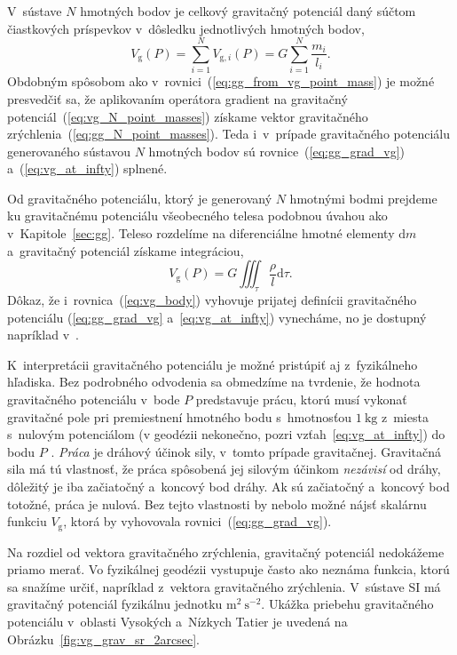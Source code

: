 \documentclass[a4paper, 12pt]{book}
\newcommand{\diff}{\mathrm d}
\newcommand{\gidx}{\mathrm g}
\begin{document}
V~sústave $N$ hmotných bodov je celkový gravitačný potenciál daný súčtom 
čiastkových príspevkov v~dôsledku jednotlivých hmotných bodov,
%
\begin{equation}
\label{eq:vg_N_point_masses}
V_\gidx(P) = \sum_{i = 1}^{N} V_{\gidx,i}(P) = G \sum_{i = 1}^{N}\frac{
m_i}{l_i}{.}
\end{equation}
%
Obdobným spôsobom ako v~rovnici~(\ref{eq:gg_from_vg_point_mass}) je možné 
presvedčiť sa, že aplikovaním operátora gradient na gravitačný 
potenciál~(\ref{eq:vg_N_point_masses}) získame vektor gravitačného 
zrýchlenia~(\ref{eq:gg_N_point_masses}).  Teda i~v~prípade gravitačného 
potenciálu generovaného sústavou $N$ hmotných bodov sú 
rovnice~(\ref{eq:gg_grad_vg}) a~(\ref{eq:vg_at_infty}) splnené.

Od gravitačného potenciálu, ktorý je generovaný $N$ hmotnými bodmi prejdeme ku 
gravitačnému potenciálu všeobecného telesa podobnou úvahou ako 
v~Kapitole~\ref{sec:gg}.  Teleso rozdelíme na diferenciálne hmotné elementy 
$\diff m$ a~gravitačný potenciál získame integráciou,
%
\begin{equation}
\label{eq:vg_body}
V_\gidx(P) = G \iiint_{\tau} \frac{\rho}{l} \diff\tau{.}
\end{equation}
%
Dôkaz, že i~rovnica~(\ref{eq:vg_body}) vyhovuje prijatej definícii gravitačného 
potenciálu (\ref{eq:gg_grad_vg} a~\ref{eq:vg_at_infty}) vynecháme, no je 
dostupný napríklad v~\cite{MacMillan1930}.

K~interpretácii gravitačného potenciálu je možné pristúpiť aj z~fyzikálneho 
hľadiska.  Bez podrobného odvodenia sa obmedzíme na tvrdenie, že hodnota 
gravitačného potenciálu v~bode $P$ predstavuje prácu, ktorú musí vykonať 
gravitačné pole pri premiestnení hmotného bodu s~hmotnosťou $1\ \mathrm{kg}$ 
z~miesta s~nulovým potenciálom (v geodézii nekonečno, pozri 
vzťah~\ref{eq:vg_at_infty}) do bodu $P$ 
\citep{MacMillan1930,Kellogg1967,TorgeGeodesy}.  \emph{Práca} je dráhový účinok 
sily, v~tomto prípade gravitačnej.  Gravitačná sila má tú vlastnosť, že práca 
spôsobená jej silovým účinkom \emph{nezávisí} od dráhy, dôležitý je iba 
začiatočný a~koncový bod dráhy.  Ak sú začiatočný a~koncový bod totožné, práca 
je nulová.  Bez tejto vlastnosti by nebolo možné nájsť skalárnu funkciu 
$V_\gidx$, ktorá by vyhovovala rovnici~(\ref{eq:gg_grad_vg}).

Na rozdiel od vektora gravitačného zrýchlenia, gravitačný potenciál nedokážeme 
priamo merať.  Vo fyzikálnej geodézii vystupuje často ako neznáma funkcia, 
ktorú sa snažíme určiť, napríklad z~vektora gravitačného zrýchlenia.  V~sústave 
SI má gravitačný potenciál fyzikálnu jednotku $\mathrm{m}^2\ \mathrm{s}^{-2}$.  
Ukážka priebehu gravitačného potenciálu v~oblasti Vysokých a~Nízkych Tatier je 
uvedená na Obrázku~\ref{fig:vg_grav_sr_2arcsec}.
\end{document}
